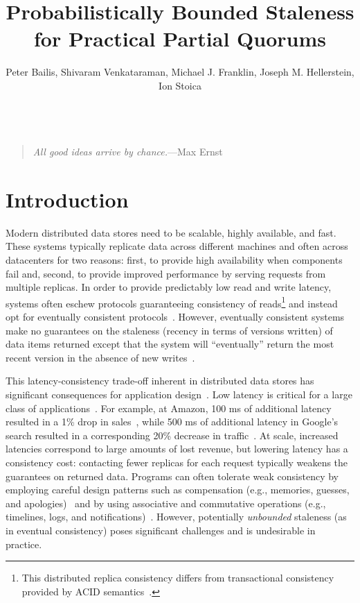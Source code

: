 \documentclass{vldb}
\title{Probabilistically Bounded Staleness\\ for Practical Partial Quorums}
\author{Peter Bailis, Shivaram Venkataraman, Michael J. Franklin, Joseph M. Hellerstein, Ion Stoica\\
\affaddr{University of California, Berkeley}\\
\affaddr{\{pbailis, shivaram, franklin, hellerstein, istoica\}@cs.berkeley.edu}}
\newcommand{\sectionskip}{-0em}
\begin{document}

\maketitle

\begin{quote}
\textit{All good ideas arrive by chance.}---Max Ernst
\end{quote}



\vspace{\sectionskip}\section{Introduction}

Modern distributed data stores need to be scalable, highly available,
and fast.  These systems typically replicate data across different
machines and often across datacenters for two reasons: first, to
provide high availability when components fail and, second, to provide
improved performance by serving requests from multiple replicas.  In
order to provide predictably low read and write latency, systems often
eschew protocols guaranteeing consistency of reads\footnote{This
  distributed replica consistency differs from transactional
  consistency provided by ACID semantics~\cite{nosql,
    urbanmyths}.} and instead opt for eventually
consistent protocols~\cite{cassandradefault, abadilatconsist, dynamo,
  feinbergpc, reddit, riaktalkone, outbrain}.  However, eventually
consistent systems make no guarantees on the staleness (recency in
terms of versions written) of data items returned except that the
system will ``eventually'' return the most recent version in the
absence of new writes~\cite{vogels-defs}.

This latency-consistency trade-off inherent in distributed data stores
has significant consequences for application
design~\cite{abadilatconsist}. Low latency is critical for a large
class of applications~\cite{perf-impact}. For example, at Amazon, 100
ms of additional latency resulted in a 1\% drop in
sales~\cite{amazon-latency}, while 500 ms of additional latency in
Google's search resulted in a corresponding 20\% decrease in
traffic~\cite{google-talk}.  At scale, increased latencies correspond
to large amounts of lost revenue, but lowering latency has a
consistency cost: contacting fewer replicas for each request typically
weakens the guarantees on returned data. Programs can often tolerate
weak consistency by employing careful design patterns such as
compensation (e.g., memories, guesses, and apologies)~\cite{helland}
and by using associative and commutative operations (e.g., timelines,
logs, and notifications)~\cite{calm}.  However, potentially
\textit{unbounded} staleness (as in eventual consistency) poses
significant challenges and is undesirable in practice.
\end{document}
